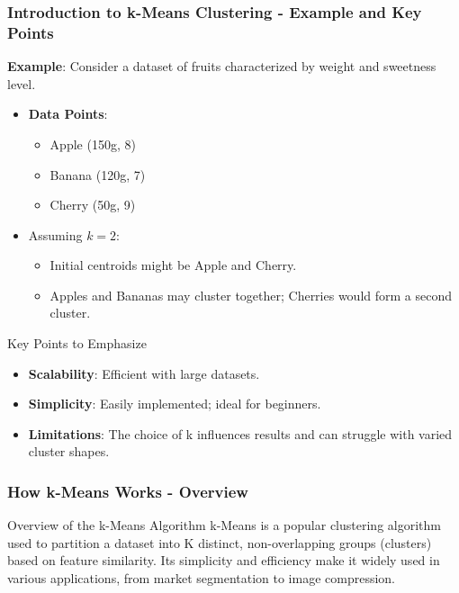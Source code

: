 \documentclass[aspectratio=169]{beamer}
\begin{document}
\begin{frame}[fragile]
    \frametitle{Introduction to k-Means Clustering - Example and Key Points}
    \textbf{Example}: Consider a dataset of fruits characterized by weight and sweetness level.
    \begin{itemize}
        \item \textbf{Data Points}:
            \begin{itemize}
                \item Apple (150g, 8)
                \item Banana (120g, 7)
                \item Cherry (50g, 9)
            \end{itemize}
        \item Assuming \( k = 2 \):
            \begin{itemize}
                \item Initial centroids might be Apple and Cherry.
                \item Apples and Bananas may cluster together; Cherries would form a second cluster.
            \end{itemize}
    \end{itemize}
    
    \begin{block}{Key Points to Emphasize}
        \begin{itemize}
            \item \textbf{Scalability}: Efficient with large datasets.
            \item \textbf{Simplicity}: Easily implemented; ideal for beginners.
            \item \textbf{Limitations}: The choice of k influences results and can struggle with varied cluster shapes.
        \end{itemize}
    \end{block}
\end{frame}

\begin{frame}[fragile]
    \frametitle{How k-Means Works - Overview}
    \begin{block}{Overview of the k-Means Algorithm}
        k-Means is a popular clustering algorithm used to partition a dataset into K distinct, non-overlapping groups (clusters) based on feature similarity. 
        Its simplicity and efficiency make it widely used in various applications, from market segmentation to image compression.
    \end{block}
\end{frame}
\end{document}
